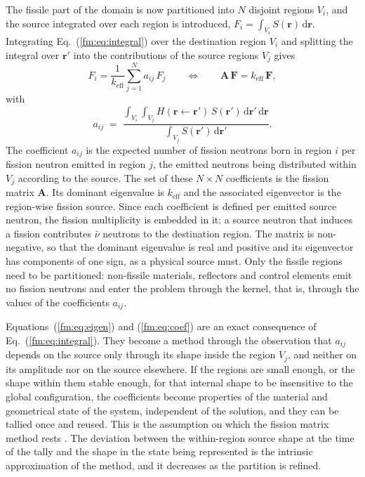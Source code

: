 The fissile part of the domain is now partitioned into $N$ disjoint regions
$V_i$, and the source integrated over each region is introduced,
$F_i = \int_{V_i} S(\mathbf r)\,\mathrm d\mathbf r$. Integrating
Eq.~(\ref{fm:eq:integral}) over the destination region $V_i$ and splitting the
integral over $\mathbf r'$ into the contributions of the source regions $V_j$
gives
%
\begin{equation}
  F_i = \frac{1}{k_{\mathrm{eff}}}\sum_{j=1}^{N} a_{ij}\,F_j
  \qquad\Longleftrightarrow\qquad
  \mathbf{A}\,\mathbf{F} = k_{\mathrm{eff}}\,\mathbf{F},
  \label{fm:eq:eigen}
\end{equation}
%
with
%
\begin{equation}
  a_{ij} \;=\;
  \frac{\displaystyle\int_{V_i}\!\int_{V_j}
        H(\mathbf r \leftarrow \mathbf r')\,S(\mathbf r')\,
        \mathrm d\mathbf r'\,\mathrm d\mathbf r}
       {\displaystyle\int_{V_j} S(\mathbf r')\,\mathrm d\mathbf r'} .
  \label{fm:eq:coef}
\end{equation}
%
The coefficient $a_{ij}$ is the expected number of fission neutrons born in
region $i$ per fission neutron emitted in region $j$, the emitted neutrons
being distributed within $V_j$ according to the source. The set of these
$N\times N$ coefficients is the fission matrix $\mathbf A$. Its dominant
eigenvalue is $k_{\mathrm{eff}}$ and the associated eigenvector is the
region-wise fission source. Since each coefficient is defined per emitted
source neutron, the fission multiplicity is embedded in it: a source neutron
that induces a fission contributes $\bar\nu$ neutrons to the destination
region. The matrix is non-negative, so that the dominant eigenvalue is real and
positive and its eigenvector has components of one sign, as a physical source
must. Only the fissile regions need to be partitioned: non-fissile materials,
reflectors and control elements emit no fission neutrons and enter the problem
through the kernel, that is, through the values of the coefficients $a_{ij}$.

Equations~(\ref{fm:eq:eigen}) and (\ref{fm:eq:coef}) are an exact consequence
of Eq.~(\ref{fm:eq:integral}). They become a method through the observation that $a_{ij}$ depends on the source only through its shape inside the region
$V_j$, and neither on its amplitude nor on the source elsewhere. If the regions
are small enough, or the shape within them stable enough, for that internal
shape to be insensitive to the global configuration, the coefficients become
properties of the material and geometrical state of the system, independent of
the solution, and they can be tallied once and reused. This is the assumption
on which the fission matrix method rests \cite{CarneyANE2014}. The deviation
between the within-region source shape at the time of the tally and the shape
in the state being represented is the intrinsic approximation of the method,
and it decreases as the partition is refined.

